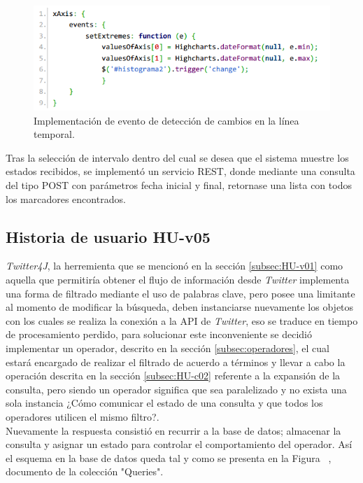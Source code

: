 \begin{figure}[H]
	\centering
	\captionsetup{justification=centering}
	\includegraphics[scale=0.8]{images/onChangeEventTimeline.png}
	\caption[Implementación de evento de detección de cambios en la línea temporal.]{Implementación de evento de detección de cambios en la línea temporal.}
	\label{fig:implementacionCambiosEnEje}
\end{figure}

Tras la selección de intervalo dentro del cual se desea que el sistema muestre los estados recibidos, se implementó un servicio REST, donde mediante una consulta del tipo POST con parámetros fecha inicial y final, retornase una lista con todos los marcadores encontrados.

\subsection{Historia de usuario HU-v05}
\label{subsec:HU-v05}

\textit{Twitter4J}, la herremienta que se mencionó en la sección \ref{subsec:HU-v01} como aquella que permitiría obtener el flujo de información desde \textit{Twitter} implementa una forma de filtrado mediante el uso de palabras clave, pero posee una limitante al momento de modificar la búsqueda, deben instanciarse nuevamente los objetos con los cuales se realiza la conexión a la API de \textit{Twitter}, eso se traduce en tiempo de procesamiento perdido, para solucionar este inconveniente se decidió implementar un operador, descrito en la sección \ref{subsec:operadores}, el cual estará encargado de realizar el filtrado de acuerdo a términos y llevar a cabo la operación descrita en la sección \ref{subsec:HU-c02} referente a la expansión de la consulta, pero siendo un operador significa que sea paralelizado y no exista una sola instancia ¿Cómo comunicar el estado de una consulta y que todos los operadores utilicen el mismo filtro?.\\

Nuevamente la respuesta consistió en recurrir a la base de datos; almacenar la consulta y asignar un estado para controlar el comportamiento del operador. Así el esquema en la base de datos queda tal y como se presenta en la Figura ~, documento de la colección "Queries".

